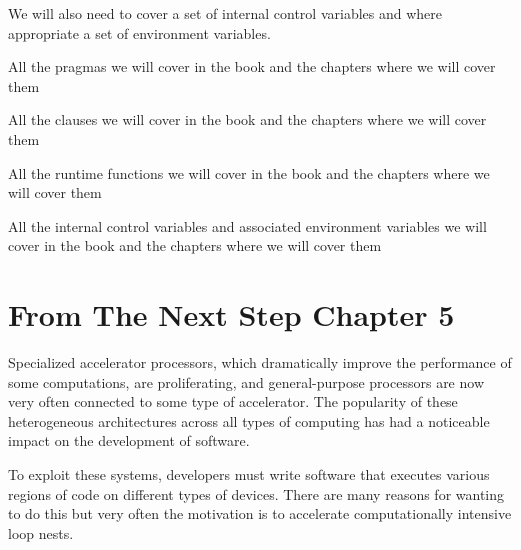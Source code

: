We will also need to cover a set of internal control variables and where appropriate a set of environment variables.

\begin{table}[h!]
\centering
\caption{All the pragmas we will cover in the book and the chapters where we will cover them}
\label{YourLabel}

 \end{table}

\begin{table}[h!]
\centering
\caption{All the clauses we will cover in the book and the chapters where we will cover them}
\label{YourLabel}

 \end{table}
 
\begin{table}[h!]
\centering
\caption{All the runtime functions we will cover in the book and the chapters where we will cover them}
\label{YourLabel}

 \end{table}
 
\begin{table}[h!]
\centering
\caption{All the internal control variables and associated environment variables we will 
cover in the book and the chapters where we will cover them}
\label{YourLabel}

 \end{table}


\section{From The Next Step Chapter 5}

Specialized accelerator processors, which dramatically improve the performance
of some computations, are proliferating, and general-purpose processors are
now very often connected to some type of accelerator.  
The popularity of these heterogeneous architectures across all types of
computing has had a noticeable impact on the development of software.  

To exploit these systems, developers must write software that executes various
regions of code on different types of devices.  There are many reasons for
wanting to do this but very often the motivation is to accelerate
computationally intensive loop nests.  

